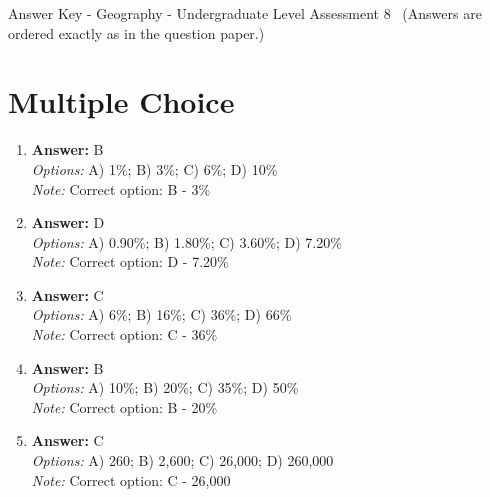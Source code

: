 \documentclass[12pt]{article}
\begin{document}
\begin{center}
Answer Key - Geography - Undergraduate Level Assessment 8 \
\small (Answers are ordered exactly as in the question paper.)
\end{center}

\section*{Multiple Choice}
\begin{enumerate}[label=\arabic*.]
\item \textbf{Answer:} B
\\ \textit{Options:} A) 1\%; B) 3\%; C) 6\%; D) 10\%
\\ \textit{Note:} Correct option: B - 3\%
\item \textbf{Answer:} D
\\ \textit{Options:} A) 0.90\%; B) 1.80\%; C) 3.60\%; D) 7.20\%
\\ \textit{Note:} Correct option: D - 7.20\%
\item \textbf{Answer:} C
\\ \textit{Options:} A) 6\%; B) 16\%; C) 36\%; D) 66\%
\\ \textit{Note:} Correct option: C - 36\%
\item \textbf{Answer:} B
\\ \textit{Options:} A) 10\%; B) 20\%; C) 35\%; D) 50\%
\\ \textit{Note:} Correct option: B - 20\%
\item \textbf{Answer:} C
\\ \textit{Options:} A) 260; B) 2,600; C) 26,000; D) 260,000
\\ \textit{Note:} Correct option: C - 26,000
\end{enumerate}
\end{document}

